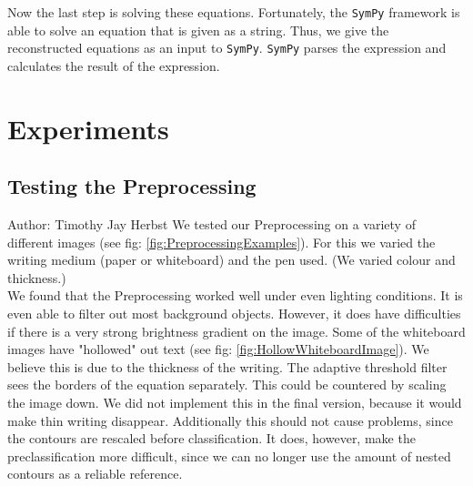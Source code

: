 \documentclass[11pt]{article}
\begin{document}
	Now the last step is solving these equations. Fortunately, the \texttt{SymPy} framework is able to solve an equation that is given as a string. Thus, we give the reconstructed equations as an input to \texttt{SymPy}. \texttt{SymPy} parses the expression and calculates the result of the expression.
	
	
	\section{Experiments}
	
	\subsection{Testing the Preprocessing}
	
	\small{Author: Timothy Jay Herbst} \newline \newline
	We tested our Preprocessing on a variety of different images (see fig: \ref{fig:PreprocessingExamples}).
	For this we varied the writing medium (paper or whiteboard) and the pen used.
	(We varied colour and thickness.)\\
	We found that the Preprocessing worked well under even lighting conditions.
	It is even able to filter out most background objects.
	However, it does have difficulties if there is a very strong brightness gradient on the image.
	Some of the whiteboard images have "hollowed" out text (see fig: \ref{fig:HollowWhiteboardImage}).
	We believe this is due to the thickness of the writing.
	The adaptive threshold filter sees the borders of the equation separately.
	This could be countered by scaling the image down.
	We did not implement this in the final version, because it would make thin writing disappear.
	Additionally this should not cause problems, since the contours are rescaled before classification.
	It does, however, make the preclassification more difficult, since we can no longer use the amount of nested contours as a reliable reference.
\end{document}
